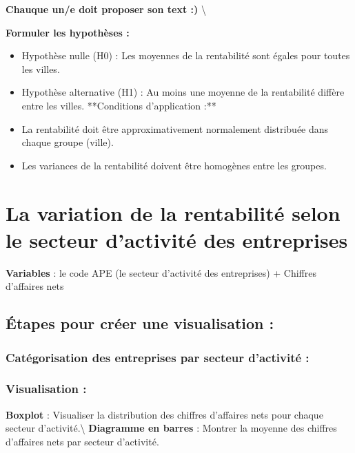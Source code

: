 \documentclass[mstat,12pt]{unswthesis}
\begin{document}
\textbf{Chauque un/e doit proposer son text :) }\textbackslash{}
\bigskip

\textbf{Formuler les hypothèses :} \bigskip

\begin{itemize}[label=$\circ$]
\item Hypothèse nulle (H0) : Les moyennes de la rentabilité sont égales
pour toutes les villes.
\item Hypothèse alternative (H1) : Au moins une moyenne de la
rentabilité diffère entre les villes.
\bigskip
**Conditions d'application :**
\bigskip
\item La rentabilité doit être approximativement normalement distribuée
dans chaque groupe (ville).
\item Les variances de la rentabilité doivent être homogènes entre les
groupes.
\end{itemize}

\newpage

\section{\texorpdfstring{\textbf{La variation de la rentabilité selon le
secteur d'activité des
entreprises}}{La variation de la rentabilité selon le secteur d'activité des entreprises}}\label{la-variation-de-la-rentabilituxe9-selon-le-secteur-dactivituxe9-des-entreprises}

\bigskip

\textbf{Variables} : le code APE (le secteur d'activité des entreprises)
+ Chiffres d'affaires nets

\subsection{Étapes pour créer une visualisation
:}\label{uxe9tapes-pour-cruxe9er-une-visualisation-3}

\subsubsection{Catégorisation des entreprises par secteur d'activité
:}\label{catuxe9gorisation-des-entreprises-par-secteur-dactivituxe9}

\subsubsection{Visualisation :}\label{visualisation}

\textbf{Boxplot} : Visualiser la distribution des chiffres d'affaires
nets pour chaque secteur d'activité.\textbackslash{} \textbf{Diagramme
en barres} : Montrer la moyenne des chiffres d'affaires nets par secteur
d'activité.
\end{document}
